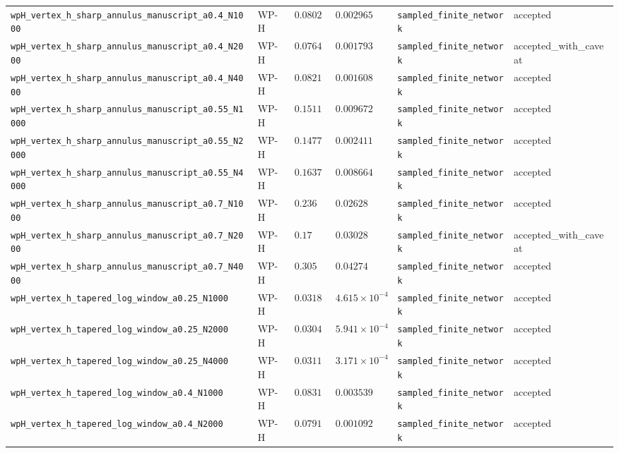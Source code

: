 \begin{table}[t]
\begin{tabular}{@{}llllll@{}}
\texttt{wpH\_vertex\_h\_sharp\_annulus\_manuscript\_a0.4\_N1000} & WP-H & $0.0802$ & $0.002965$ & \texttt{sampled\_finite\_network} & accepted \\
\texttt{wpH\_vertex\_h\_sharp\_annulus\_manuscript\_a0.4\_N2000} & WP-H & $0.0764$ & $0.001793$ & \texttt{sampled\_finite\_network} & accepted\_with\_caveat \\
\texttt{wpH\_vertex\_h\_sharp\_annulus\_manuscript\_a0.4\_N4000} & WP-H & $0.0821$ & $0.001608$ & \texttt{sampled\_finite\_network} & accepted \\
\texttt{wpH\_vertex\_h\_sharp\_annulus\_manuscript\_a0.55\_N1000} & WP-H & $0.1511$ & $0.009672$ & \texttt{sampled\_finite\_network} & accepted \\
\texttt{wpH\_vertex\_h\_sharp\_annulus\_manuscript\_a0.55\_N2000} & WP-H & $0.1477$ & $0.002411$ & \texttt{sampled\_finite\_network} & accepted \\
\texttt{wpH\_vertex\_h\_sharp\_annulus\_manuscript\_a0.55\_N4000} & WP-H & $0.1637$ & $0.008664$ & \texttt{sampled\_finite\_network} & accepted \\
\texttt{wpH\_vertex\_h\_sharp\_annulus\_manuscript\_a0.7\_N1000} & WP-H & $0.236$ & $0.02628$ & \texttt{sampled\_finite\_network} & accepted \\
\texttt{wpH\_vertex\_h\_sharp\_annulus\_manuscript\_a0.7\_N2000} & WP-H & $0.17$ & $0.03028$ & \texttt{sampled\_finite\_network} & accepted\_with\_caveat \\
\texttt{wpH\_vertex\_h\_sharp\_annulus\_manuscript\_a0.7\_N4000} & WP-H & $0.305$ & $0.04274$ & \texttt{sampled\_finite\_network} & accepted \\
\texttt{wpH\_vertex\_h\_tapered\_log\_window\_a0.25\_N1000} & WP-H & $0.03184$ & $4.615\times10^{-4}$ & \texttt{sampled\_finite\_network} & accepted \\
\texttt{wpH\_vertex\_h\_tapered\_log\_window\_a0.25\_N2000} & WP-H & $0.03043$ & $5.941\times10^{-4}$ & \texttt{sampled\_finite\_network} & accepted \\
\texttt{wpH\_vertex\_h\_tapered\_log\_window\_a0.25\_N4000} & WP-H & $0.03115$ & $3.171\times10^{-4}$ & \texttt{sampled\_finite\_network} & accepted \\
\texttt{wpH\_vertex\_h\_tapered\_log\_window\_a0.4\_N1000} & WP-H & $0.0831$ & $0.003539$ & \texttt{sampled\_finite\_network} & accepted \\
\texttt{wpH\_vertex\_h\_tapered\_log\_window\_a0.4\_N2000} & WP-H & $0.0791$ & $0.001092$ & \texttt{sampled\_finite\_network} & accepted \\

\end{tabular}
\end{table}
